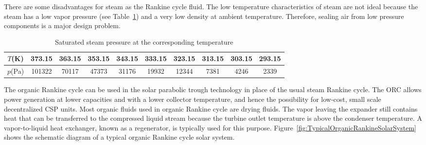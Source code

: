 There are some disadvantages for steam as the Rankine cycle fluid. The low temperature characteristics of steam are not ideal because the steam has a low vapor pressure (see Table~\ref{tab:waterT_P}) and a very low density at ambient temperature. Therefore, sealing air from low pressure components is a major design problem.
\begin{table}[htbp]
	\caption{Saturated steam pressure at the corresponding temperature}
	\begin{center}
	\begin{tabular}{cccccccccc}
		\toprule	
		    $T$(K)    &	373.15	    &    363.15    &    353.15    &    343.15    &    333.15    &    323.15    &    313.15    &    303.15    &    293.15\\
		\midrule	
		    $p$(Pa)    &    101322        &    70117    &    47373    &    31176    &    19932    &    12344    &    7381    &    4246    &    2339\\
		\bottomrule
	\end{tabular}
	\end{center}
	\label{tab:waterT_P}
\end{table}


The organic Rankine cycle can be used in the solar parabolic trough technology in place of the usual steam Rankine cycle. The ORC allows power generation at lower capacities and with a lower collector temperature, and hence the possibility for low-cost, small scale decentralized CSP units. Most organic fluids used in organic Rankine cycle are drying fluids. The vapor leaving the expander still contains heat that can be transferred to the compressed liquid stream because the turbine outlet temperature is above the condenser temperature. A vapor-to-liquid heat exchanger, known as a regenerator, is typically used for this purpose.
Figure~\ref{fig:TypicalOrganicRankineSolarSystem} shows the schematic diagram of a typical organic Rankine cycle solar system. 

